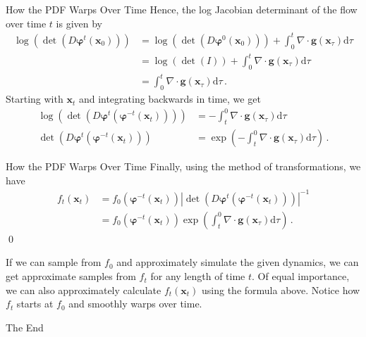 \documentclass[10pt]{beamer}
\begin{document}
\begin{frame}[fragile]{How the PDF Warps Over Time}
Hence, the log Jacobian determinant of the flow over time \(t\) is given by
\begin{equation*}\begin{aligned}
    \log\left(\det\left(D\bm{\varphi}^t\left(\bm{x}_0\right)\right)\right) &= \log\left(\det\left(D\bm{\varphi}^0\left(\bm{x}_0\right)\right)\right) + \int_0^t \nabla\cdot\bm{g}\left(\bm{x}_\tau\right)\mathrm{d}\tau\\
    &= \log\left(\det\left(I\right)\right) + \int_0^t \nabla\cdot\bm{g}\left(\bm{x}_\tau\right)\mathrm{d}\tau\\
    &= \int_0^t \nabla\cdot\bm{g}\left(\bm{x}_\tau\right)\mathrm{d}\tau\,.
\end{aligned}\end{equation*}
Starting with \(\bm{x}_t\) and integrating backwards in time, we get
\begin{equation*}\begin{aligned}
    \log\left(\det\left(D\bm{\varphi}^t\left(\bm{\varphi}^{-t}\left(\bm{x}_t\right)\right)\right)\right) &= -\int_t^0 \nabla\cdot\bm{g}\left(\bm{x}_\tau\right)\mathrm{d}\tau\\
    \det\left(D\bm{\varphi}^t\left(\bm{\varphi}^{-t}\left(\bm{x}_t\right)\right)\right) &= \exp\left(-\int_t^0 \nabla\cdot\bm{g}\left(\bm{x}_\tau\right)\mathrm{d}\tau\right)\,.
\end{aligned}\end{equation*}
\end{frame}

\begin{frame}[fragile]{How the PDF Warps Over Time}
Finally, using the method of transformations, we have
\begin{equation*}
    \begin{aligned}
        f_t\left(\bm{x}_t\right) &= f_0\left(\bm{\varphi}^{-t}\left(\bm{x}_t\right)\right)\left|\det\left(D\bm{\varphi}^t\left(\bm{\varphi}^{-t}\left(\bm{x}_t\right)\right)\right)\right|^{-1}\\&= f_0\left(\bm{\varphi}^{-t}\left(\bm{x}_t\right)\right)\exp\left(\int_t^0 \nabla\cdot\bm{g}\left(\bm{x}_\tau\right)\mathrm{d}\tau\right)\,.
    \end{aligned}
\end{equation*}
\qed

If we can sample from \(f_0\) and approximately simulate the given dynamics, we can get approximate samples from \(f_t\) for any length of time \(t\). Of equal importance, we can also approximately calculate \(f_t\left(\bm{x}_t\right)\) using the formula above. Notice how \(f_t\) starts at \(f_0\) and smoothly warps over time.
\end{frame}

\begin{frame}[standout]
The End
\end{frame}
\end{document}
